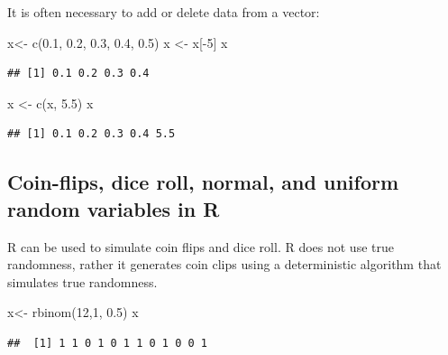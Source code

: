 \documentclass[
]{article}
\newenvironment{Shaded}{\begin{snugshade}}{\end{snugshade}}
\newcommand{\DecValTok}[1]{\textcolor[rgb]{0.00,0.00,0.81}{#1}}
\newcommand{\FloatTok}[1]{\textcolor[rgb]{0.00,0.00,0.81}{#1}}
\newcommand{\FunctionTok}[1]{\textcolor[rgb]{0.00,0.00,0.00}{#1}}
\newcommand{\NormalTok}[1]{#1}
\newcommand{\OtherTok}[1]{\textcolor[rgb]{0.56,0.35,0.01}{#1}}
\newcommand{\SpecialCharTok}[1]{\textcolor[rgb]{0.00,0.00,0.00}{#1}}
\theoremstyle{definition}
\theoremstyle{definition}
\theoremstyle{definition}
\theoremstyle{remark}
\begin{document}
It is often necessary to add or delete data from a vector:

\begin{Shaded}
\begin{Highlighting}[]
\NormalTok{x}\OtherTok{\textless{}{-}} \FunctionTok{c}\NormalTok{(}\FloatTok{0.1}\NormalTok{, }\FloatTok{0.2}\NormalTok{, }\FloatTok{0.3}\NormalTok{, }\FloatTok{0.4}\NormalTok{, }\FloatTok{0.5}\NormalTok{)}
\NormalTok{x }\OtherTok{\textless{}{-}}\NormalTok{ x[}\SpecialCharTok{{-}}\DecValTok{5}\NormalTok{]}
\NormalTok{x}
\end{Highlighting}
\end{Shaded}

\begin{verbatim}
## [1] 0.1 0.2 0.3 0.4
\end{verbatim}

\begin{Shaded}
\begin{Highlighting}[]
\NormalTok{x }\OtherTok{\textless{}{-}} \FunctionTok{c}\NormalTok{(x, }\FloatTok{5.5}\NormalTok{)}
\NormalTok{x}
\end{Highlighting}
\end{Shaded}

\begin{verbatim}
## [1] 0.1 0.2 0.3 0.4 5.5
\end{verbatim}

\hypertarget{coin-flips-dice-roll-normal-and-uniform-random-variables-in-r}{%
\subsection{Coin-flips, dice roll, normal, and uniform random variables in R}\label{coin-flips-dice-roll-normal-and-uniform-random-variables-in-r}}

R can be used to simulate coin flips and dice roll. R does not use true randomness, rather it generates coin clips using a deterministic algorithm that simulates true randomness.

\begin{Shaded}
\begin{Highlighting}[]
\NormalTok{x}\OtherTok{\textless{}{-}} \FunctionTok{rbinom}\NormalTok{(}\DecValTok{12}\NormalTok{,}\DecValTok{1}\NormalTok{, }\FloatTok{0.5}\NormalTok{)}
\NormalTok{x}
\end{Highlighting}
\end{Shaded}

\begin{verbatim}
##  [1] 1 1 0 1 0 1 1 0 1 0 0 1
\end{verbatim}
\end{document}
